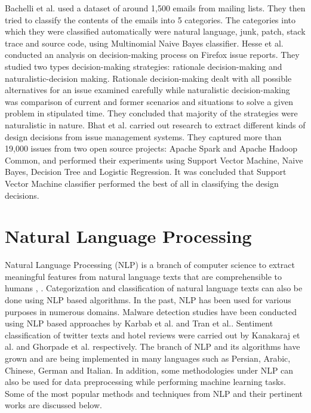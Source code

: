 \documentclass[a4paper,12pt,twoside]{report}
\begin{document}
\newline \newline
Bachelli et al.\cite{Bacchelli2012} used a dataset of around 1,500 emails from mailing lists. They then tried to classify the contents of the emails into 5 categories. The categories into which they were classified automatically were natural language, junk, patch, stack trace and source code, using Multinomial Naive Bayes classifier. 
\newline \newline
Hesse et al.\cite{Hesse2016} conducted an analysis on decision-making process on Firefox issue reports. They studied two types decision-making strategies: rationale decision-making and naturalistic-decision making. Rationale decision-making dealt with all possible alternatives for an issue examined carefully while naturalistic decision-making was comparison of current and former scenarios and situations to solve a given problem in stipulated time. They concluded that majority of the strategies were naturalistic in nature. 
\newline \newline
Bhat et al.\cite{Bhat2017} carried out research to extract different kinds of design decisions from issue management systems. They captured more than 19,000 issues from two open source projects: Apache Spark and Apache Hadoop Common, and performed their experiments using Support Vector Machine, Naive Bayes, Decision Tree and Logistic Regression. It was concluded that Support Vector Machine classifier performed the best of all in classifying the design decisions. 


\section{Natural Language Processing}

Natural Language Processing (\acs{NLP}) is a branch of computer science to extract meaningful features from natural language texts that are comprehensible to humans \cite{Al-ghamdi2017}, \cite{Suhaimin2017}. Categorization and classification of natural language texts can also be done using \acs{NLP} based algorithms. In the past, \acs{NLP} has been used for various purposes in numerous domains. Malware detection studies have been conducted using \acs{NLP} based approaches by Karbab et al. \cite{Karbab2017} and Tran et al.\cite{Tran2017}. Sentiment classification of twitter texts and hotel reviews were carried out by Kanakaraj et al.\cite{Kanakaraj2015} and Ghorpade et al.\cite{Ghorpade2012} respectively. The branch of \acs{NLP} and its algorithms have grown and are being implemented in many languages such as Persian\cite{Ri}, Arabic\cite{Abuleil2007}, Chinese\cite{Liu2008}, German\cite{Metzmacher2017} and Italian\cite{Damiano2017}. 
\newline \newline
In addition, some methodologies under \acs{NLP} can also be used for data preprocessing while performing machine learning tasks. Some of the most popular methods and techniques from \acs{NLP} and their pertinent works are discussed below. 
\end{document}
